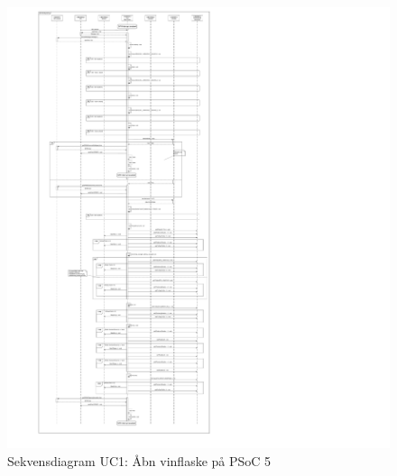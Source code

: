 \begin{figure}[H]
	\caption{Sekvensdiagram UC1: Åbn vinflaske på PSoC 5}
	\label{SD:PSoC:UC1}
	\includegraphics[scale=0.2,trim=0 0 0 0, clip]{APPSoC/UC1-Aaben-nu-v1-simplified}
\end{figure}
